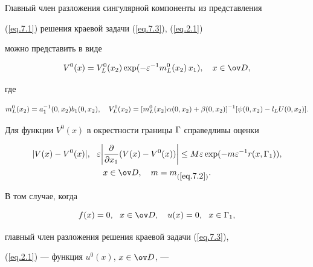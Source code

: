 \begin{notes}


Главный член разложения сингулярной компоненты из представления


(\ref{eq.7.1}) решения краевой задачи (\ref{eq.7.3}), (\ref{eq.2.1})


можно представить в виде


$$


V^0(x) = V^0_L(x_2)\exp (-\eps^{-1}m^0_L(x_2)\, x_1),\quad x \in \od,


$$


где


$$




m_L^0(x_2)=a_1^{-1}(0,x_2) b_1(0,x_2),\quad


%


V_L^0(x_2) = [m_L^0(x_2)\al(0, x_2)+\beta(0, x_2)]^{-1}


[\psi(0,x_2) -l_L U(0,x_2)].




$$


Для функции $V^0(x)$ в окрестности границы $\Gamma$ справедливы оценки


\begin{gather}


|V(x) - V^0(x)|,\ \


\eps\bigg|\frac{\pad}{\pad x_1}(V(x) - V^0(x))\bigg|


\leq M \eps \exp(-m \eps^{-1} r(x,\G_1)),\notag\\


%


\label{eq.7.4}


x \in \od,\quad m = m_{(\ref{eq.7.2})}. 


\end{gather}





В том случае, когда


\begin{equation} \label{eq.7.5}


f(x) = 0, \ \ x \in \od, \quad u(x) = 0, \ \ x\in \G_1,


\end{equation}


главный член разложения решения краевой задачи (\ref{eq.7.3}),


(\ref{eq.2.1}) --- функция $u^0(x)$, $x\in \od$, ---



\end{notes}

